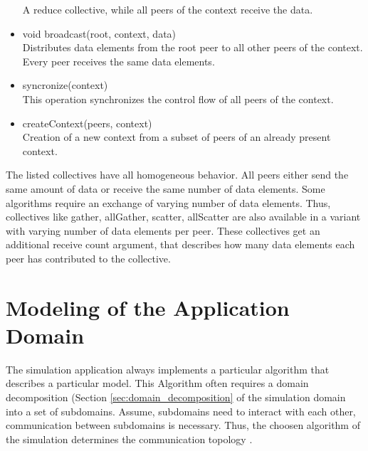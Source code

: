 \begin{itemize}
  A reduce collective, while all peers of the context receive the
  data.

\item void broadcast(root, context, data)\\

  Distributes data elements from the root peer to all other peers of
  the context. Every peer receives the same data elements.

\item syncronize(context)\\

  This operation synchronizes the control flow of all peers of the
  context.

\item createContext(peers, context)\\ 

  Creation of a new context from a subset of peers of an already
  present context.

\end{itemize}

The listed collectives have all homogeneous behavior. All peers either
send the same amount of data or receive the same number of data elements.
Some algorithms require an  exchange of varying number of data elements. Thus,
collectives like gather, allGather, scatter, allScatter are also available
in a variant with varying number of data elements per peer. These collectives
get an additional receive count argument, that describes how many data elements
each peer has contributed to the collective.


\section{Modeling of the Application Domain}
\label{sec:graph}
The simulation application always implements a particular algorithm
that describes a particular model. This Algorithm often requires a
domain decomposition (Section \ref{sec:domain_decomposition} of the
simulation domain into a set of subdomains. Assume, subdomains need
to interact with each other, communication between subdomains is
necessary. Thus, the choosen algorithm of the simulation determines
the communication topology .

